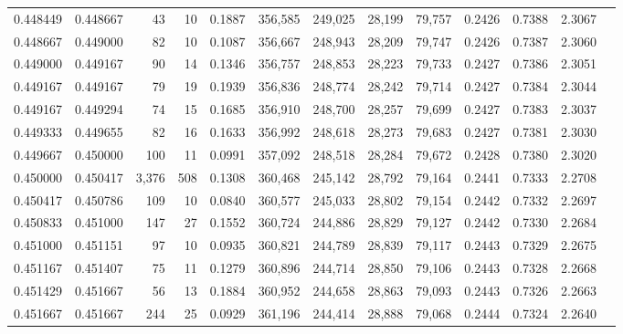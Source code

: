 \begin{tabular}{rrrrrrrrrrrrr}
0.448449 & 0.448667 &    43 &  10 &                                     0.1887 & 356,585 & 249,025 &  28,199 &  79,757 & 0.2426 & 0.7388 & 2.3067 \\
0.448667 & 0.449000 &    82 &  10 &                                     0.1087 & 356,667 & 248,943 &  28,209 &  79,747 & 0.2426 & 0.7387 & 2.3060 \\
0.449000 & 0.449167 &    90 &  14 &                                     0.1346 & 356,757 & 248,853 &  28,223 &  79,733 & 0.2427 & 0.7386 & 2.3051 \\
0.449167 & 0.449167 &    79 &  19 &                                     0.1939 & 356,836 & 248,774 &  28,242 &  79,714 & 0.2427 & 0.7384 & 2.3044 \\
0.449167 & 0.449294 &    74 &  15 &                                     0.1685 & 356,910 & 248,700 &  28,257 &  79,699 & 0.2427 & 0.7383 & 2.3037 \\
0.449333 & 0.449655 &    82 &  16 &                                     0.1633 & 356,992 & 248,618 &  28,273 &  79,683 & 0.2427 & 0.7381 & 2.3030 \\
0.449667 & 0.450000 &   100 &  11 &                                     0.0991 & 357,092 & 248,518 &  28,284 &  79,672 & 0.2428 & 0.7380 & 2.3020 \\
0.450000 & 0.450417 & 3,376 & 508 &                                     0.1308 & 360,468 & 245,142 &  28,792 &  79,164 & 0.2441 & 0.7333 & 2.2708 \\
0.450417 & 0.450786 &   109 &  10 &                                     0.0840 & 360,577 & 245,033 &  28,802 &  79,154 & 0.2442 & 0.7332 & 2.2697 \\
0.450833 & 0.451000 &   147 &  27 &                                     0.1552 & 360,724 & 244,886 &  28,829 &  79,127 & 0.2442 & 0.7330 & 2.2684 \\
0.451000 & 0.451151 &    97 &  10 &                                     0.0935 & 360,821 & 244,789 &  28,839 &  79,117 & 0.2443 & 0.7329 & 2.2675 \\
0.451167 & 0.451407 &    75 &  11 &                                     0.1279 & 360,896 & 244,714 &  28,850 &  79,106 & 0.2443 & 0.7328 & 2.2668 \\
0.451429 & 0.451667 &    56 &  13 &                                     0.1884 & 360,952 & 244,658 &  28,863 &  79,093 & 0.2443 & 0.7326 & 2.2663 \\
0.451667 & 0.451667 &   244 &  25 &                                     0.0929 & 361,196 & 244,414 &  28,888 &  79,068 & 0.2444 & 0.7324 & 2.2640 \\

\end{tabular}
